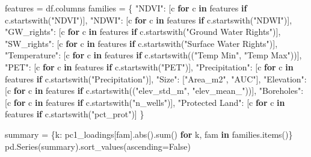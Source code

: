 \documentclass[
  letterpaper,
  DIV=11,
  numbers=noendperiod]{scrreprt}
\newenvironment{Shaded}{\begin{snugshade}}{\end{snugshade}}
\newcommand{\BuiltInTok}[1]{\textcolor[rgb]{0.00,0.23,0.31}{#1}}
\newcommand{\ControlFlowTok}[1]{\textcolor[rgb]{0.00,0.23,0.31}{\textbf{#1}}}
\newcommand{\KeywordTok}[1]{\textcolor[rgb]{0.00,0.23,0.31}{\textbf{#1}}}
\newcommand{\NormalTok}[1]{\textcolor[rgb]{0.00,0.23,0.31}{#1}}
\newcommand{\OperatorTok}[1]{\textcolor[rgb]{0.37,0.37,0.37}{#1}}
\newcommand{\StringTok}[1]{\textcolor[rgb]{0.13,0.47,0.30}{#1}}
\newcommand{\VariableTok}[1]{\textcolor[rgb]{0.07,0.07,0.07}{#1}}
\begin{document}
\begin{Shaded}
\begin{Highlighting}[]
\NormalTok{features }\OperatorTok{=}\NormalTok{ df.columns}
\NormalTok{families }\OperatorTok{=}\NormalTok{ \{}
    \StringTok{"NDVI"}\NormalTok{:  [c }\ControlFlowTok{for}\NormalTok{ c }\KeywordTok{in}\NormalTok{ features }\ControlFlowTok{if}\NormalTok{ c.startswith(}\StringTok{"NDVI"}\NormalTok{)],}
    \StringTok{"NDWI"}\NormalTok{:  [c }\ControlFlowTok{for}\NormalTok{ c }\KeywordTok{in}\NormalTok{ features }\ControlFlowTok{if}\NormalTok{ c.startswith(}\StringTok{"NDWI"}\NormalTok{)],}
    \StringTok{"GW\_rights"}\NormalTok{: [c }\ControlFlowTok{for}\NormalTok{ c }\KeywordTok{in}\NormalTok{ features }\ControlFlowTok{if}\NormalTok{ c.startswith(}\StringTok{"Ground Water Rights"}\NormalTok{)],}
    \StringTok{"SW\_rights"}\NormalTok{: [c }\ControlFlowTok{for}\NormalTok{ c }\KeywordTok{in}\NormalTok{ features }\ControlFlowTok{if}\NormalTok{ c.startswith(}\StringTok{"Surface Water Rights"}\NormalTok{)],}
    \StringTok{"Temperature"}\NormalTok{: [c }\ControlFlowTok{for}\NormalTok{ c }\KeywordTok{in}\NormalTok{ features }\ControlFlowTok{if}\NormalTok{ c.startswith((}\StringTok{"Temp Min"}\NormalTok{, }\StringTok{"Temp Max"}\NormalTok{))],}
    \StringTok{"PET"}\NormalTok{: [c }\ControlFlowTok{for}\NormalTok{ c }\KeywordTok{in}\NormalTok{ features }\ControlFlowTok{if}\NormalTok{ c.startswith(}\StringTok{"PET"}\NormalTok{)],}
    \StringTok{"Precipitation"}\NormalTok{: [c }\ControlFlowTok{for}\NormalTok{ c }\KeywordTok{in}\NormalTok{ features }\ControlFlowTok{if}\NormalTok{ c.startswith(}\StringTok{"Precipitation"}\NormalTok{)],}
    \StringTok{"Size"}\NormalTok{:   [}\StringTok{"Area\_m2"}\NormalTok{, }\StringTok{"AUC"}\NormalTok{],}
    \StringTok{"Elevation"}\NormalTok{: [c }\ControlFlowTok{for}\NormalTok{ c }\KeywordTok{in}\NormalTok{ features }\ControlFlowTok{if}\NormalTok{ c.startswith((}\StringTok{"elev\_std\_m"}\NormalTok{, }\StringTok{"elev\_mean\_"}\NormalTok{))],}
    \StringTok{"Boreholes"}\NormalTok{: [c }\ControlFlowTok{for}\NormalTok{ c }\KeywordTok{in}\NormalTok{ features }\ControlFlowTok{if}\NormalTok{ c.startswith(}\StringTok{"n\_wells"}\NormalTok{)],}
    \StringTok{"Protected Land"}\NormalTok{: [c }\ControlFlowTok{for}\NormalTok{ c }\KeywordTok{in}\NormalTok{ features }\ControlFlowTok{if}\NormalTok{ c.startswith(}\StringTok{"pct\_prot"}\NormalTok{)]}
\NormalTok{\}}

\NormalTok{summary }\OperatorTok{=}\NormalTok{ \{k: pc1\_loadings[fam].}\BuiltInTok{abs}\NormalTok{().}\BuiltInTok{sum}\NormalTok{() }\ControlFlowTok{for}\NormalTok{ k, fam }\KeywordTok{in}\NormalTok{ families.items()\}}
\NormalTok{pd.Series(summary).sort\_values(ascending}\OperatorTok{=}\VariableTok{False}\NormalTok{)}
\end{Highlighting}
\end{Shaded}
\end{document}
